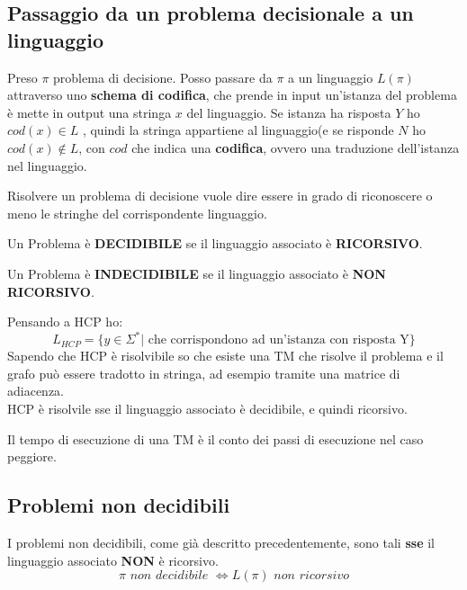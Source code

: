\subsection{Passaggio da un problema decisionale a un linguaggio}
\begin{definizione}
  Preso $\pi$ problema di decisione. Posso passare da $\pi$ a un linguaggio
  $L(\pi)$ attraverso uno \textbf{schema di codifica}, che prende in input
  un'istanza del problema è mette in output una stringa $x$ del linguaggio. Se
  istanza ha risposta $Y$ ho $cod(x)\in L$ , quindi la stringa appartiene al linguaggio(e se risponde $N$ ho $cod(x)\not\in
  L$, con $cod$ che indica una 
  \textbf{codifica}, ovvero una traduzione dell'istanza nel linguaggio.\\
\end{definizione}
Risolvere un problema di decisione vuole dire essere in grado di riconoscere o meno le stringhe del corrispondente linguaggio.
\begin{definizione}
  Un Problema è \textbf{DECIDIBILE} se il linguaggio associato è \textbf{RICORSIVO}. 
\end{definizione}
\begin{definizione}
  Un Problema è \textbf{INDECIDIBILE} se il linguaggio associato è \textbf{NON RICORSIVO}. 
\end{definizione}
\begin{esempio}
  Pensando a HCP ho:
  \[L_{HCP}=\{y\in \Sigma^*|\mbox{ che corrispondono ad un'istanza con risposta
      Y}\}\]
  Sapendo che HCP è risolvibile so che esiste una TM che risolve il problema e
  il grafo può essere tradotto in stringa, ad esempio tramite una matrice di
  adiacenza.\\
  HCP è risolvile sse il linguaggio associato è decidibile, e quindi ricorsivo.
\end{esempio}
\begin{definizione}
  Il tempo di esecuzione di una TM è il conto dei passi di esecuzione nel caso
  peggiore.
\end{definizione}
\newpage
\subsection{Problemi non decidibili}
I problemi non decidibili, come già descritto precedentemente, sono tali \textbf{sse} il linguaggio associato \textbf{NON} è ricorsivo.
\[\pi \,\, non\,\,decidibile\,\, \iff L(\pi)\,\,non \,\,ricorsivo\]
